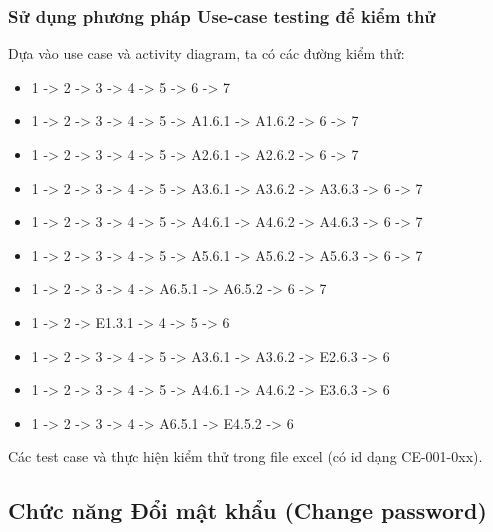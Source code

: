 \documentclass[a4paper, 12pt]{article}
\begin{document}
\subsubsection{Sử dụng phương pháp Use-case testing để kiểm thử}
Dựa vào use case và activity diagram, ta có các đường kiểm thử:
\begin{itemize}
    \item 1 -> 2 -> 3 -> 4 -> 5 -> 6 -> 7
    \item 1 -> 2 -> 3 -> 4 -> 5 -> A1.6.1 -> A1.6.2 -> 6 -> 7
    \item 1 -> 2 -> 3 -> 4 -> 5 -> A2.6.1 -> A2.6.2 -> 6 -> 7
    \item 1 -> 2 -> 3 -> 4 -> 5 -> A3.6.1 -> A3.6.2 -> A3.6.3 -> 6 -> 7
    \item 1 -> 2 -> 3 -> 4 -> 5 -> A4.6.1 -> A4.6.2 -> A4.6.3 -> 6 -> 7
    \item 1 -> 2 -> 3 -> 4 -> 5 -> A5.6.1 -> A5.6.2 -> A5.6.3 -> 6 -> 7
    \item 1 -> 2 -> 3 -> 4 -> A6.5.1 -> A6.5.2 -> 6 -> 7
    \item 1 -> 2 -> E1.3.1 -> 4 -> 5 -> 6
    \item 1 -> 2 -> 3 -> 4 -> 5 -> A3.6.1 -> A3.6.2 -> E2.6.3 -> 6
    \item 1 -> 2 -> 3 -> 4 -> 5 -> A4.6.1 -> A4.6.2 -> E3.6.3 -> 6
    \item 1 -> 2 -> 3 -> 4 -> A6.5.1 -> E4.5.2 -> 6
\end{itemize}
Các test case và thực hiện kiểm thử trong file excel (có id dạng CE-001-0xx).
\subsection{Chức năng Đổi mật khẩu (Change password)}
\end{document}
